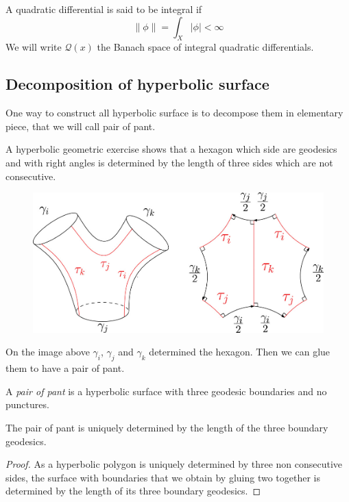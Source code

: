 
A quadratic differential is said to be integral if\[
 \| \phi \| = \int_X | \phi | < \infty
\]
We will write $\mathcal{Q}(x)$ the Banach space of integral quadratic differentials.

\subsection{Decomposition of hyperbolic surface}

One way to construct all hyperbolic surface is to decompose them in elementary piece, that we will call pair of pant.

A hyperbolic geometric exercise shows that a hexagon which side are geodesics and with right angles is determined by the length of three sides which are not consecutive.

\begin{figure}[!h]
\centering
\includegraphics[width=12cm]{Image/PairOfPant.jpg}
\end{figure}

 On the image above $\gamma_i$, $\gamma_j$ and $\gamma_k$ determined the hexagon. Then we can glue them to have a pair of pant.

 \begin{dfnt}
 A \emph{pair of pant} is a hyperbolic surface with three geodesic boundaries and no punctures.
 \end{dfnt}

\begin{rmq}
The pair of pant is uniquely determined by the length of the three boundary geodesics.
\end{rmq}

\begin{proof}
As a hyperbolic polygon is uniquely determined by three non consecutive sides, the surface with boundaries that we obtain by gluing two together is determined by the length of its three boundary geodesics.
\end{proof}

